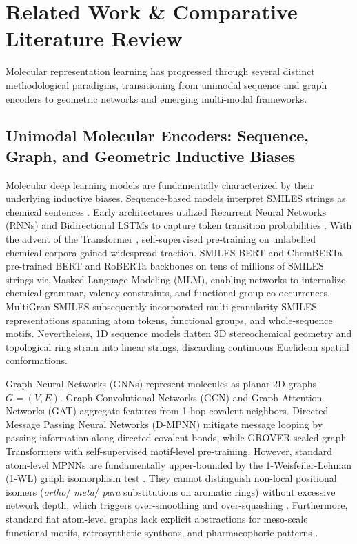 \documentclass[10pt,twocolumn]{article}
\begin{document}
\section{Related Work \& Comparative Literature Review}

Molecular representation learning has progressed through several distinct methodological paradigms, transitioning from unimodal sequence and graph encoders to geometric networks and emerging multi-modal frameworks.

\subsection{Unimodal Molecular Encoders: Sequence, Graph, and Geometric Inductive Biases}

Molecular deep learning models are fundamentally characterized by their underlying inductive biases. Sequence-based models interpret SMILES strings as chemical sentences \cite{weininger1988smiles}. Early architectures utilized Recurrent Neural Networks (RNNs) and Bidirectional LSTMs to capture token transition probabilities \cite{honda2019smiles}. With the advent of the Transformer \cite{vaswani2017attention}, self-supervised pre-training on unlabelled chemical corpora gained widespread traction. SMILES-BERT \cite{wang2019smiles} and ChemBERTa \cite{chithrananda2020chemberta} pre-trained BERT and RoBERTa backbones on tens of millions of SMILES strings via Masked Language Modeling (MLM), enabling networks to internalize chemical grammar, valency constraints, and functional group co-occurrences. MultiGran-SMILES \cite{jiang2022multigran} subsequently incorporated multi-granularity SMILES representations spanning atom tokens, functional groups, and whole-sequence motifs. Nevertheless, 1D sequence models flatten 3D stereochemical geometry and topological ring strain into linear strings, discarding continuous Euclidean spatial conformations.

Graph Neural Networks (GNNs) represent molecules as planar 2D graphs $G=(V, E)$. Graph Convolutional Networks (GCN) \cite{kipf2017semi} and Graph Attention Networks (GAT) \cite{velickovic2018graph} aggregate features from 1-hop covalent neighbors. Directed Message Passing Neural Networks (D-MPNN) \cite{yang2019analyzing} mitigate message looping by passing information along directed covalent bonds, while GROVER \cite{rong2020self} scaled graph Transformers with self-supervised motif-level pre-training. However, standard atom-level MPNNs are fundamentally upper-bounded by the 1-Weisfeiler-Lehman (1-WL) graph isomorphism test \cite{xu2019powerful}. They cannot distinguish non-local positional isomers (\textit{ortho}/ \textit{meta}/ \textit{para} substitutions on aromatic rings) without excessive network depth, which triggers over-smoothing and over-squashing \cite{wang2020molecular}. Furthermore, standard flat atom-level graphs lack explicit abstractions for meso-scale functional motifs, retrosynthetic synthons, and pharmacophoric patterns \cite{yang2021fragat, zhang2025property, jiang2023pharmacophoric}.
\end{document}
